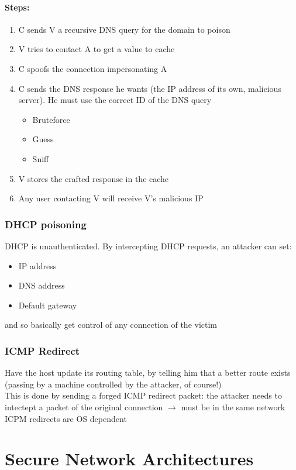 \documentclass{article}
\begin{document}
\paragraph{Steps:}
\begin{enumerate}
\item C sends V a recursive DNS query for the domain to poison
\item V tries to contact A to get a value to cache
\item C spoofs the connection impersonating A
\item C sends the DNS response he wants (the IP address of its own, malicious server). He must use the correct ID of the DNS query
	\begin{itemize}
	\item Bruteforce
	\item Guess
	\item Sniff
	\end{itemize}
\item V stores the crafted response in the cache
\item Any user contacting V will receive V's malicious IP
\end{enumerate}
\subsubsection{DHCP poisoning}
DHCP is unauthenticated. By intercepting DHCP requests, an attacker can set:
\begin{itemize}
\item IP address
\item DNS address
\item Default gateway
\end{itemize}
and so basically get control of any connection of the victim
\subsubsection{ICMP Redirect}
Have the host update its routing table, by telling him that a better route exists (passing by a machine controlled by the attacker, of course!)\\
This is done by sending a forged ICMP redirect packet: the attacker needs to intectept a packet of the original connection $\rightarrow$ must be in the same network\\
ICPM redirects are OS dependent 

\section{Secure Network Architectures}
\end{document}
